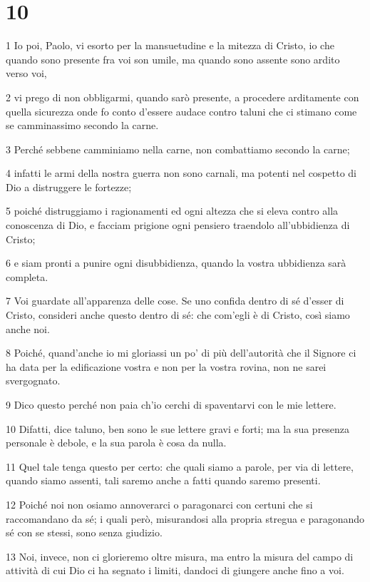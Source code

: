 \chapter{10}

\par 1 Io poi, Paolo, vi esorto per la mansuetudine e la mitezza di Cristo, io che quando sono presente fra voi son umile, ma quando sono assente sono ardito verso voi,
\par 2 vi prego di non obbligarmi, quando sarò presente, a procedere arditamente con quella sicurezza onde fo conto d'essere audace contro taluni che ci stimano come se camminassimo secondo la carne.
\par 3 Perché sebbene camminiamo nella carne, non combattiamo secondo la carne;
\par 4 infatti le armi della nostra guerra non sono carnali, ma potenti nel cospetto di Dio a distruggere le fortezze;
\par 5 poiché distruggiamo i ragionamenti ed ogni altezza che si eleva contro alla conoscenza di Dio, e facciam prigione ogni pensiero traendolo all'ubbidienza di Cristo;
\par 6 e siam pronti a punire ogni disubbidienza, quando la vostra ubbidienza sarà completa.
\par 7 Voi guardate all'apparenza delle cose. Se uno confida dentro di sé d'esser di Cristo, consideri anche questo dentro di sé: che com'egli è di Cristo, così siamo anche noi.
\par 8 Poiché, quand'anche io mi gloriassi un po' di più dell'autorità che il Signore ci ha data per la edificazione vostra e non per la vostra rovina, non ne sarei svergognato.
\par 9 Dico questo perché non paia ch'io cerchi di spaventarvi con le mie lettere.
\par 10 Difatti, dice taluno, ben sono le sue lettere gravi e forti; ma la sua presenza personale è debole, e la sua parola è cosa da nulla.
\par 11 Quel tale tenga questo per certo: che quali siamo a parole, per via di lettere, quando siamo assenti, tali saremo anche a fatti quando saremo presenti.
\par 12 Poiché noi non osiamo annoverarci o paragonarci con certuni che si raccomandano da sé; i quali però, misurandosi alla propria stregua e paragonando sé con se stessi, sono senza giudizio.
\par 13 Noi, invece, non ci glorieremo oltre misura, ma entro la misura del campo di attività di cui Dio ci ha segnato i limiti, dandoci di giungere anche fino a voi.
